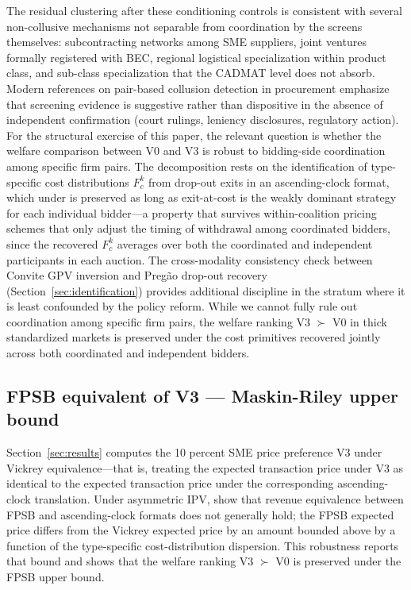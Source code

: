 The residual clustering after these conditioning controls is consistent with several non-collusive mechanisms not separable from coordination by the screens themselves: subcontracting networks among SME suppliers, joint ventures formally registered with BEC, regional logistical specialization within product class, and sub-class specialization that the CADMAT level does not absorb. Modern references on pair-based collusion detection in procurement \citep{conley2016, kawainakabayashi2022} emphasize that screening evidence is suggestive rather than dispositive in the absence of independent confirmation (court rulings, leniency disclosures, regulatory action). For the structural exercise of this paper, the relevant question is whether the welfare comparison between V0 and V3 is robust to bidding-side coordination among specific firm pairs. The decomposition rests on the identification of type-specific cost distributions $F_c^k$ from drop-out exits in an ascending-clock format, which under \citet{haile2003} is preserved as long as exit-at-cost is the weakly dominant strategy for each individual bidder---a property that survives within-coalition pricing schemes that only adjust the timing of withdrawal among coordinated bidders, since the recovered $F_c^k$ averages over both the coordinated and independent participants in each auction. The cross-modality consistency check between Convite GPV inversion and Preg\~ao drop-out recovery (Section~\ref{sec:identification}) provides additional discipline in the stratum where it is least confounded by the policy reform. While we cannot fully rule out coordination among specific firm pairs, the welfare ranking V3 $\succ$ V0 in thick standardized markets is preserved under the cost primitives recovered jointly across both coordinated and independent bidders.

\subsection{FPSB equivalent of V3 — Maskin-Riley upper bound}\label{sec:fpsb_bound}

Section~\ref{sec:results} computes the 10 percent SME price preference V3 under Vickrey equivalence---that is, treating the expected transaction price under V3 as identical to the expected transaction price under the corresponding ascending-clock translation. Under asymmetric IPV, \citet{maskinriley2000} show that revenue equivalence between FPSB and ascending-clock formats does not generally hold; the FPSB expected price differs from the Vickrey expected price by an amount bounded above by a function of the type-specific cost-distribution dispersion. This robustness reports that bound and shows that the welfare ranking V3 $\succ$ V0 is preserved under the FPSB upper bound.

